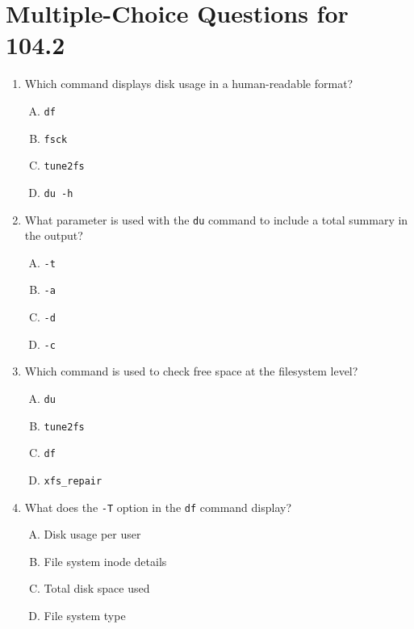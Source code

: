 \documentclass[a4paper]{report}
\begin{document}
\newpage
\section*{Multiple-Choice Questions for 104.2}
\begin{enumerate}[1.]

    \item Which command displays disk usage in a human-readable format?  
    \begin{enumerate}[A)]
        \item \texttt{df}  
        \item \texttt{fsck}  
        \item \texttt{tune2fs}  
        \item \texttt{du -h}  
    \end{enumerate}

    \item What parameter is used with the \texttt{du} command to include a total summary in the output?  
    \begin{enumerate}[A)]
        \item \texttt{-t}  
        \item \texttt{-a}  
        \item \texttt{-d}  
        \item \texttt{-c}  
    \end{enumerate}

    \item Which command is used to check free space at the filesystem level?  
    \begin{enumerate}[A)]
        \item \texttt{du}  
        \item \texttt{tune2fs}  
        \item \texttt{df}  
        \item \texttt{xfs\_repair}  
    \end{enumerate}

    \item What does the \texttt{-T} option in the \texttt{df} command display?  
    \begin{enumerate}[A)]
        \item Disk usage per user  
        \item File system inode details  
        \item Total disk space used  
        \item File system type  
    \end{enumerate}


\end{enumerate}
\end{document}
